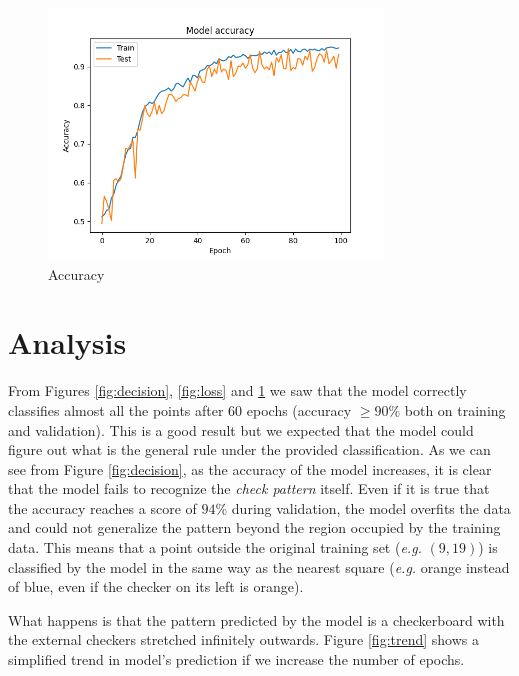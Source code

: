 \documentclass[compsoc]{IEEEtran}
\begin{document}
\begin{figure}[ht!]
\centering                                                                        
\includegraphics[width=3.5in]{../images/accuracy-4000-6-binary_crossentropy-adam-100-4.png}
\captionsetup{justification=centering}                                                                                                                                   
\caption{Accuracy}
\label{fig:acc}                                                                                                                                                           
\end{figure}



\section{Analysis}
From Figures \ref{fig:decision}, \ref{fig:loss} and \ref{fig:acc} we saw that the model correctly classifies almost all the points after 60 epochs (accuracy $\geq 90\%$ both on training and validation). This is a good result but we expected that the model could figure out what is the general rule under the provided classification.  
As we can see from Figure \ref{fig:decision}, as the accuracy of the model increases, it is clear that the model fails to recognize the \emph{check pattern} itself. Even if it is true that the accuracy reaches a score of $94\%$ during validation, the model overfits the data and could not generalize the pattern beyond the region occupied by the training data. 
This means that a point outside the original training set (\emph{e.g.} $(9, 19)$) is classified by the model in the same way as the nearest square (\emph{e.g.} orange instead of blue, even if the checker on its left is orange). \par
What happens is that the pattern predicted by the model is a checkerboard with the external checkers stretched infinitely outwards.
Figure \ref{fig:trend} shows a simplified trend in model's prediction if we increase the number of epochs.
\end{document}

